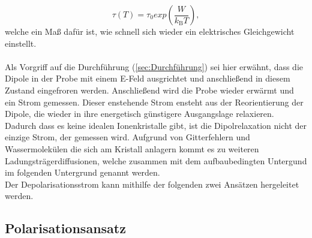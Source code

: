 \begin{equation}
    \tau(T) = \tau_0 exp(\frac{W}{k_\text{B} T}),
    \label{eqn:Relaxationszeit}
\end{equation}
welche ein Maß dafür ist, wie schnell sich wieder ein elektrisches Gleichgewicht einstellt.\\
\\ 
Als Vorgriff auf die Durchführung (\ref{sec:Durchführung}) sei hier erwähnt, dass die Dipole in der Probe
mit einem E-Feld ausgrichtet und anschließend in diesem Zustand eingefroren werden. Anschließend
wird die Probe wieder erwärmt und ein Strom gemessen. Dieser enstehende Strom ensteht aus der Reorientierung
der Dipole, die wieder in ihre energetisch günstigere Ausgangslage relaxieren. Dadurch dass es keine idealen Ionenkristalle
gibt, ist die Dipolrelaxation nicht der einzige Strom, der gemessen wird. Aufgrund von Gitterfehlern und Wassermolekülen die sich am Kristall
anlagern kommt es zu weiteren Ladungsträgerdiffusionen, welche zusammen mit dem aufbaubedingten Untergund im folgenden Untergrund genannt werden. \\
Der Depolarisationsstrom kann mithilfe der folgenden zwei Ansätzen hergeleitet werden.


\subsection{Polarisationsansatz}
\label{subsec:Polarisation}

